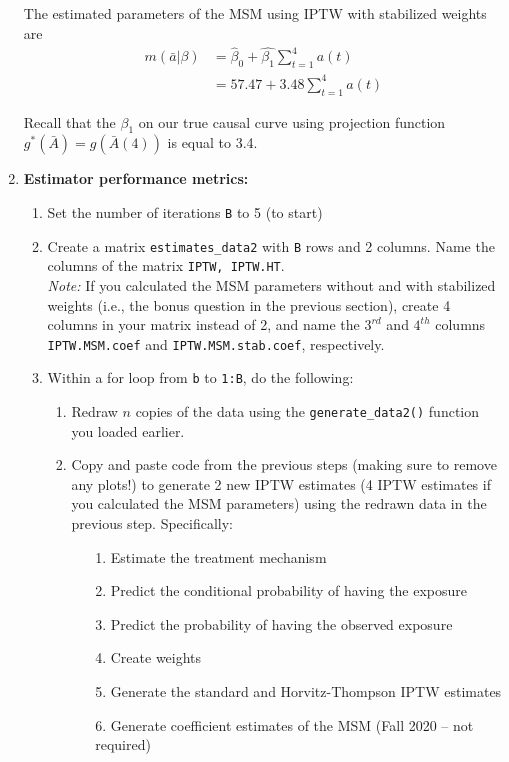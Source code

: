\documentclass[answers]{exam}
\begin{document}
\begin{enumerate}
\begin{solution}
The estimated parameters of the MSM using IPTW with stabilized weights are 
\begin{align*}
m(\bar{a}|\beta) & = \hat{\beta}_0 + \hat{\beta_1}\sum_{t=1}^4a(t) \\
& = 57.47 + 3.48\sum_{t=1}^4a(t)
\end{align*}

Recall that the $\beta_1$ on our true causal curve using projection function $g^*(\bar{A}) = g(\bar{A}(4))$ is equal to 3.4.

\end{solution}

\item \textbf{Estimator performance metrics:}

\begin{enumerate}
\item Set the number of iterations \texttt{B} to 5 (to start)
\item Create a matrix \texttt{estimates\_data2} with \texttt{B} rows and 2 columns. Name the columns of the matrix \texttt{IPTW, IPTW.HT}. \\
\textit{Note:} If you calculated the MSM parameters without and with stabilized weights (i.e., the bonus question in the previous section), create 4 columns in your matrix instead of 2, and name the $3^{rd}$ and $4^{th}$ columns \texttt{IPTW.MSM.coef} and \texttt{IPTW.MSM.stab.coef}, respectively.
\item Within a for loop from \texttt{b} to \texttt{1:B}, do the following:
\begin{enumerate}
\item Redraw $n$ copies of the data using the \texttt{generate\_data2()} function you loaded earlier. 
\item Copy and paste code from the previous steps (making sure to remove any plots!) to generate 2 new IPTW estimates (4 IPTW estimates if you calculated the MSM parameters) using the redrawn data in the previous step. Specifically: 
\begin{enumerate}
\item[1.] Estimate the treatment mechanism
\item[2.] Predict the conditional probability of having the exposure
\item[3.] Predict the probability of having the observed exposure
\item[4.] Create weights
\item[5.] Generate the standard and Horvitz-Thompson IPTW estimates
\item[6.] Generate coefficient estimates of the MSM (Fall 2020 -- not required)

\end{enumerate}
\end{enumerate}
\end{enumerate}
\end{enumerate}
\end{document}
